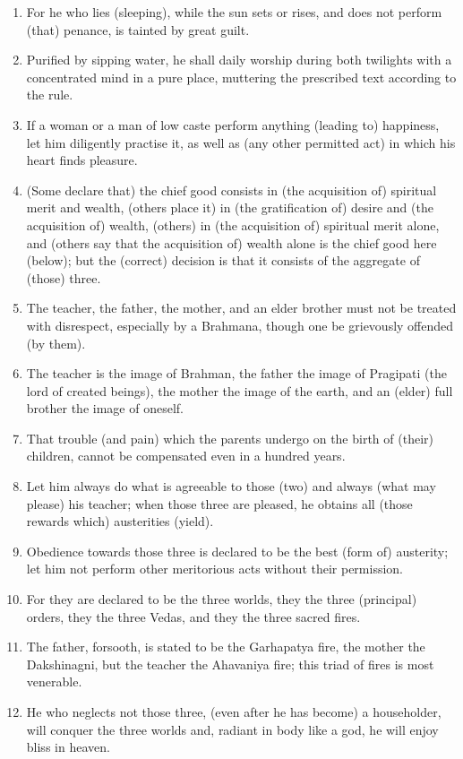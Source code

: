 \begin{enumerate}
\item For he who lies (sleeping), while the sun sets or rises, and does not perform (that) penance, is tainted by great guilt.
\item Purified by sipping water, he shall daily worship during both twilights with a concentrated mind in a pure place, muttering the prescribed text according to the rule.
\item If a woman or a man of low caste perform anything (leading to) happiness, let him diligently practise it, as well as (any other permitted act) in which his heart finds pleasure.
\item (Some declare that) the chief good consists in (the acquisition of) spiritual merit and wealth, (others place it) in (the gratification of) desire and (the acquisition of) wealth, (others) in (the acquisition of) spiritual merit alone, and (others say that the acquisition of) wealth alone is the chief good here (below); but the (correct) decision is that it consists of the aggregate of (those) three.
\item The teacher, the father, the mother, and an elder brother must not be treated with disrespect, especially by a Brahmana, though one be grievously offended (by them).
\item The teacher is the image of Brahman, the father the image of Pragipati (the lord of created beings), the mother the image of the earth, and an (elder) full brother the image of oneself.
\item That trouble (and pain) which the parents undergo on the birth of (their) children, cannot be compensated even in a hundred years.
\item Let him always do what is agreeable to those (two) and always (what may please) his teacher; when those three are pleased, he obtains all (those rewards which) austerities (yield).
\item Obedience towards those three is declared to be the best (form of) austerity; let him not perform other meritorious acts without their permission.
\item For they are declared to be the three worlds, they the three (principal) orders, they the three Vedas, and they the three sacred fires.
\item The father, forsooth, is stated to be the Garhapatya fire, the mother the Dakshinagni, but the teacher the Ahavaniya fire; this triad of fires is most venerable.
\item He who neglects not those three, (even after he has become) a householder, will conquer the three worlds and, radiant in body like a god, he will enjoy bliss in heaven.

\end{enumerate}
